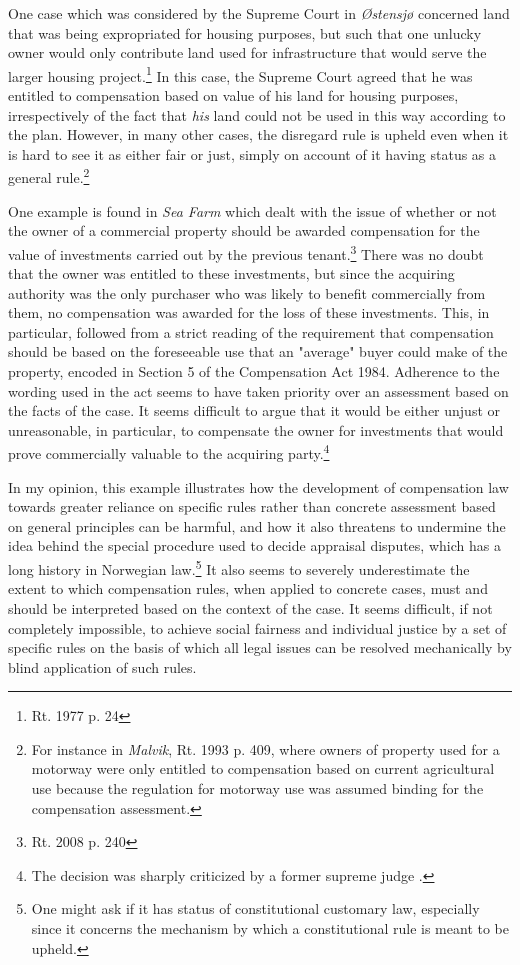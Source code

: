 One case which was considered by the Supreme Court in \emph{Østensjø} concerned land that was being expropriated for housing purposes, but such that one unlucky owner would only contribute land used for infrastructure that would serve the larger housing project.\footnote{Rt. 1977 p. 24} In this case, the Supreme Court agreed that he was entitled to compensation based on value of his land for housing purposes, irrespectively of the fact that \emph{his} land could not be used in this way according to the plan. However, in many other cases, the disregard rule is upheld even when it is hard to see it as either fair or just, simply on account of it having status as a general rule.\footnote{For instance in \emph{Malvik}, Rt. 1993 p. 409, where owners of property used for a motorway were only entitled to compensation based on current agricultural use because the regulation for motorway use was assumed binding for the compensation assessment.} 

One example is found in \emph{Sea Farm} which dealt with the issue of whether or not the owner of a commercial property should be awarded compensation for the value of investments carried out by the previous tenant.\footnote{Rt. 2008 p. 240} There was no doubt that the owner was entitled to these investments, but since the acquiring authority was the only purchaser who was likely to benefit commercially from them, no compensation was awarded for the loss of these investments. This, in particular, followed from a strict reading of the requirement that compensation should be based on the foreseeable use that an "average" buyer could make of the property, encoded in Section 5 of the Compensation Act 1984. Adherence to the wording used in the act seems to have taken priority over an assessment based on the facts of the case. It seems difficult to argue that it would be either unjust or unreasonable, in particular, to compensate the owner for investments that would prove commercially valuable to the acquiring party.\footnote{The decision was sharply criticized by a former supreme judge \cite{skog}.}

In my opinion, this example illustrates how the development of compensation law towards greater reliance on specific rules rather than concrete assessment based on general principles can be harmful, and how it also threatens to undermine the idea behind the special procedure used to decide appraisal disputes, which has a long history in Norwegian law.\footnote{One might ask if it has status of constitutional customary law, especially since it concerns the mechanism by which a constitutional rule is meant to be upheld.} It also seems to severely underestimate the extent to which compensation rules, when applied to concrete cases, must and should be interpreted based on the context of the case. It seems difficult, if not completely impossible, to achieve social fairness and individual justice by a set of specific rules on the basis of which all legal issues can be resolved mechanically by blind application of such rules. %

